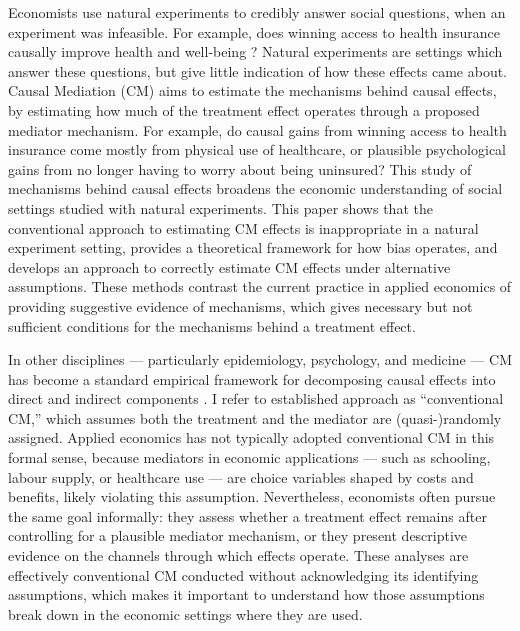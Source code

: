Economists use natural experiments to credibly answer social questions, when an experiment was infeasible.
For example, does winning access to health insurance causally improve health and well-being \citep{finkelstein2008oregon}?
Natural experiments are settings which answer these questions, but give little indication of how these effects came about.
Causal Mediation (CM) aims to estimate the mechanisms behind causal effects, by estimating how much of the treatment effect operates through a proposed mediator mechanism.
For example, do causal gains from winning access to health insurance come mostly from physical use of healthcare, or plausible psychological gains from no longer having to worry about being uninsured?
This study of mechanisms behind causal effects broadens the economic understanding of social settings studied with natural experiments.
This paper shows that the conventional approach to estimating CM effects is inappropriate in a natural experiment setting, provides a theoretical framework for how bias operates, and develops an approach to correctly estimate CM effects under alternative assumptions.
These methods contrast the current practice in applied economics of providing suggestive evidence of mechanisms, which gives necessary but not sufficient conditions for the mechanisms behind a treatment effect.

In other disciplines --- particularly epidemiology, psychology, and medicine --- CM has become a standard empirical framework for decomposing causal effects into direct and indirect components \citep{imai2010identification}.
I refer to established approach as ``conventional CM,'' which assumes both the treatment and the mediator are (quasi-)randomly assigned.
Applied economics has not typically adopted conventional CM in this formal sense, because mediators in economic applications --- such as schooling, labour supply, or healthcare use --- are choice variables shaped by costs and benefits, likely violating this assumption.
Nevertheless, economists often pursue the same goal informally: they assess whether a treatment effect remains after controlling for a plausible mediator mechanism, or they present descriptive evidence on the channels through which effects operate.
These analyses are effectively conventional CM conducted without acknowledging its identifying assumptions, which makes it important to understand how those assumptions break down in the economic settings where they are used.

